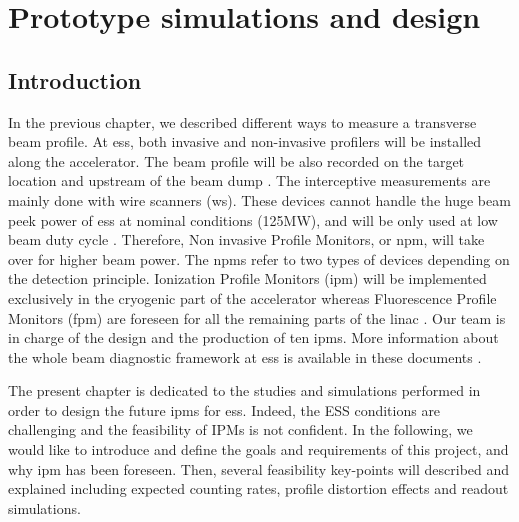 \chapter{Prototype simulations and design}
\cleardoublepage
\minitoc
\section{Introduction}
\begin{refsection}
  \label{ch3:Introduction}
  In the previous chapter, we described different ways to measure a transverse beam profile. At \acrshort{ess}, both invasive and non-invasive profilers will be installed along the accelerator. The beam profile will be also recorded on the target location and upstream of the beam dump \cite{shea2013}. The interceptive measurements are mainly done with wire scanners (\acrshort{ws}). These devices cannot handle the huge beam peek power of \acrshort{ess} at nominal conditions (125MW), and will be only used at low beam duty cycle \cite{Cheymol2013}. Therefore, Non invasive Profile Monitors, or \acrshort{npm}, will take over for higher beam power. The \acrshort{npm}s refer to two types of devices depending on the detection principle. Ionization Profile Monitors (\acrshort{ipm}) will be implemented exclusively in the cryogenic part of the accelerator whereas Fluorescence Profile Monitors (\acrshort{fpm}) are foreseen for all the remaining parts of the linac \cite{Thomas2016}. Our team is in charge of the design and the production of ten \acrshort{ipm}s. More information about the whole beam diagnostic framework at \acrshort{ess} is available in these documents \cite{Peggs2013,Shea:IBIC2017-MO2AB2}.

  The present chapter is dedicated to the studies and simulations performed in order to design the future \acrshort{ipm}s for \acrshort{ess}. Indeed, the ESS conditions are challenging and the feasibility of IPMs is not confident. In the following, we would like to introduce and define the goals and requirements of this project, and why \acrshort{ipm} has been foreseen. Then, several feasibility key-points will described and explained including expected counting rates, profile distortion effects and readout simulations.


\end{refsection}
